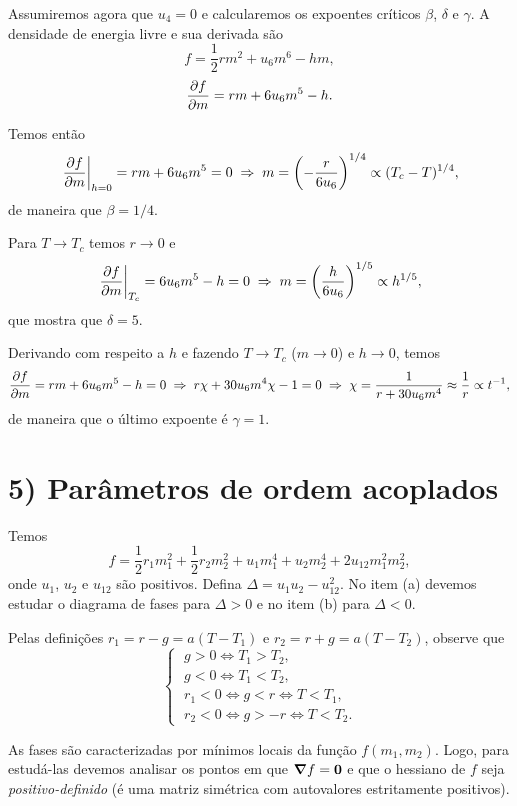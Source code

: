 \documentclass[a4paper,10pt]{article}
\begin{document}
Assumiremos agora que $u_4 = 0$ e calcularemos os expoentes críticos $\beta$, $\delta$ e $\gamma$. A densidade de energia livre e sua derivada são
$$
f = \frac{1}{2} rm^2 + u_6 m^6 - h m,
$$
$$
\pdv{f}{m} = rm + 6 u_6 m^5 - h.
$$

\n

Temos então
$$
\eval{\pdv{f}{m}}_{h=0} = rm + 6 u_6 m^5 = 0 \implies m = \qty(-\frac{r}{6u_6})^{1/4} \propto (T_c - T)^{1/4},
$$
de maneira que $\beta = 1/4$.

\n

Para $T \to T_c$ temos $r \to 0$ e
$$
\eval{\pdv{f}{m}}_{T_c} = 6 u_6 m^5 - h = 0 \implies m = \qty(\frac{h}{6u_6})^{1/5} \propto h^{1/5},
$$
que mostra que $\delta = 5$.

\n

Derivando com respeito a $h$ e fazendo $T \to T_c$ ($m \to 0$) e $h \to 0$, temos
$$
\pdv{f}{m} = rm + 6 u_6 m^5 - h = 0 \; \Rightarrow \; r \chi + 30 u_6 m^4 \chi - 1 = 0 \; \Rightarrow \;
\chi = \frac{1}{r + 30 u_6 m^4} \approx \frac{1}{r} \propto t^{-1},
$$
de maneira que o último expoente é $\gamma = 1$.



\pagebreak

\section*{5) Parâmetros de ordem acoplados}

Temos
$$
f = \frac{1}{2} r_1 m_1^2 + \frac{1}{2} r_2 m_2^2 + u_1 m_1^4 + u_2 m_2^4 + 2 u_{12} m_1^2 m_2^2,
$$
onde $u_1$, $u_2$ e $u_{12}$ são positivos. Defina $\boxed{\Delta = u_1 u_2 - u_{12}^2}$. No item (a) devemos estudar o diagrama de fases para $\Delta > 0$ e no item (b) para $\Delta < 0$.

\n

Pelas definições $r_1 = r - g = a(T-T_1)$ e $r_2 = r+g = a(T-T_2)$, observe que
$$
\begin{cases}
\; g > 0 \iff T_1 > T_2, \\
\; g < 0 \iff T_1 < T_2, \\
\; r_1 < 0 \iff g < r \iff T < T_1, \\
\; r_2 < 0 \iff g > -r \iff T < T_2.
\end{cases}
$$


As fases são caracterizadas por mínimos locais da função $f(m_1, m_2)$. Logo, para estudá-las devemos analisar os pontos em que $\grad{f} = \vb{0}$ e que o hessiano de $f$ seja \textit{positivo-definido} (é uma matriz simétrica com autovalores estritamente positivos).
\end{document}
